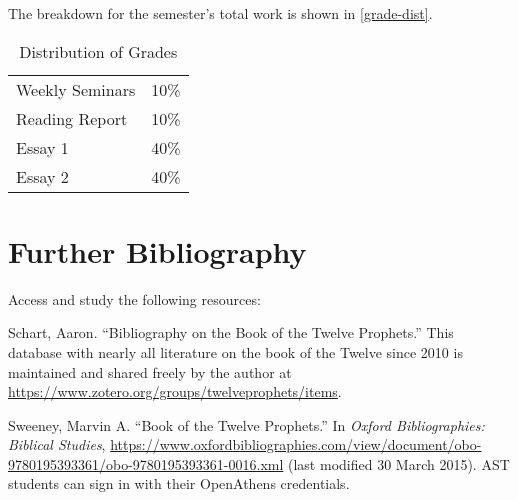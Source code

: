 \documentclass[titlepage]{article}
\newcommand\policy{../policy}
\begin{document}
The breakdown for the semester's total work is shown in
\autoref{grade-dist}.

\begin{table}[htbp]
  \centering
  {\lining
  \begin{tabular}{lr}
    \toprule
    Weekly Seminars & 10\% \\
    Reading Report  & 10\% \\
    Essay 1         & 40\% \\
    Essay 2         & 40\% \\
    \bottomrule
  \end{tabular}}
  \caption{Distribution of Grades}
  \label{grade-dist}
\end{table}




\section{Further Bibliography}
\label{bib}

Access and study the following resources:

Schart, Aaron. “Bibliography on the Book of the Twelve Prophets.” This database with nearly all literature on the book of the Twelve since 2010 is maintained and shared freely by the author at \url{https://www.zotero.org/groups/twelveprophets/items}.

Sweeney, Marvin A. “Book of the Twelve Prophets.” In \emph{Oxford Bibliographies: Biblical Studies}, \href{https://go.openathens.net/redirector/astheology.ns.ca?url=https://www.oxfordbibliographies.com/view/document/obo-9780195393361/obo-9780195393361-0016.xml}{https://www.oxfordbibliographies.com/view/document/obo-9780195393361/obo-9780195393361-0016.xml} (last modified 30 March 2015). AST students can sign in with their OpenAthens credentials.
\end{document}
